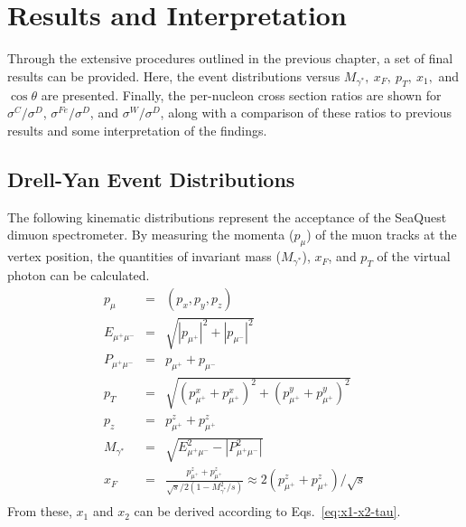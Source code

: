 \chapter{Results and Interpretation}

Through the extensive procedures outlined in the previous chapter, a set of final results can be provided. Here, the event distributions versus $M_{\gamma^*},\ x_F,\ p_T,\ x_1,$ and $\cos\theta$ are presented. Finally, the per-nucleon cross section ratios are shown for $\sigma^C/\sigma^D$, $\sigma^{Fe}/\sigma^D$, and $\sigma^W/\sigma^D$, along with a comparison of these ratios to previous results and some interpretation of the findings.

\section{Drell-Yan Event Distributions}

The following kinematic distributions represent the acceptance of the SeaQuest dimuon spectrometer. By measuring the momenta ($p_{\mu}$) of the muon tracks at the vertex position, the quantities of invariant mass ($M_{\gamma^*}$), $x_F$, and $p_T$ of the virtual photon can be calculated.
\begin{eqnarray}
p_\mu & = & (p_x, p_y, p_z) \\
E_{\mu^+\mu^-} & = & \sqrt{|p_{\mu^+}|^2 + |p_{\mu^-}|^2} \\
P_{\mu^+\mu^-} & = & p_{\mu^+} + p_{\mu^-} \\
p_T & = & \sqrt{(p_{\mu^+}^x + p_{\mu^+}^x)^2 + (p_{\mu^+}^y + p_{\mu^+}^y )^2} \\
p_z & = & p_{\mu^+}^z + p_{\mu^+}^z \\
M_{\gamma^*} & = & \sqrt{E_{\mu^+\mu^-}^2 - |P_{\mu^+\mu^-}^2|} \\
x_F & = & \frac{p_{\mu^+}^z + p_{\mu^+}^z }{\sqrt{s}/2 (1-M^2_{\gamma^*}/s)} \approx 2(p_{\mu^+}^z + p_{\mu^+}^z)/\sqrt{s} \\
\end{eqnarray}
From these, $x_1$ and $x_2$ can be derived according to Eqs.~\ref{eq:x1-x2-tau}.

